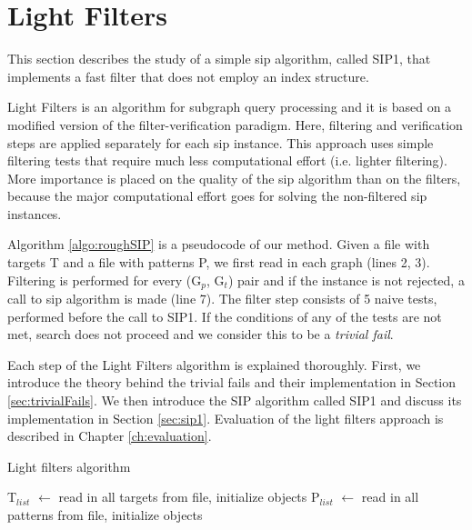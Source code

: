 \documentclass{l4proj}
\begin{document}
 
 
 

\chapter{Light Filters}
\label{ch:sip1}
This section describes the study of a simple \gls{sip} algorithm, called SIP1, that implements a fast filter that does not employ an index structure.

Light Filters is an algorithm for subgraph query processing and it is based on a modified version of the filter-verification paradigm. Here, filtering and verification steps are applied separately for each \gls{sip} instance. This approach uses simple filtering tests that require much less computational effort (i.e. lighter filtering). More importance is placed on the quality of the \gls{sip} algorithm than on the filters, because the major computational effort goes for solving the non-filtered \gls{sip} instances. 

Algorithm \ref{algo:roughSIP} is a pseudocode of our method. Given a file with targets T and a file with patterns P, we first read in each graph (lines 2, 3). Filtering is performed for every (G$_{p}$, G$_{t}$) pair and if the instance is not rejected, a call to \gls{sip} algorithm is made (line 7). The filter step consists of 5 naive tests, performed before the call to SIP1. If the conditions of any of the tests are not met, search does not proceed and we consider this to be a \textit{trivial fail}. 

Each step of the Light Filters algorithm is explained thoroughly. First, we introduce the theory behind the trivial fails and their implementation in Section \ref{sec:trivialFails}. We then introduce the SIP algorithm called SIP1 and discuss its implementation in Section \ref{sec:sip1}. Evaluation of the light filters approach is described in Chapter \ref{ch:evaluation}.

\begin{algorithm}
\centering
\caption{Light filters algorithm}
\label{algo:roughSIP}
\begin{algorithmic}[1]
 
\State T$_{list}$ $\gets$ read in all targets from file, initialize objects
\State P$_{list}$ $\gets$ read in all patterns from file, initialize objects
		 
    	\EndIf
    \EndFor
\EndFor
\EndProcedure
\end{algorithmic}
\end{algorithm}
\end{document}
